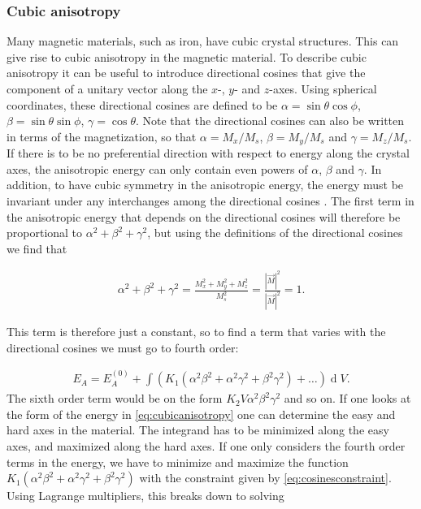 \documentclass[1p]{elsarticle}		%
\renewcommand{\d}[1]{\ensuremath{\operatorname{d}\!{#1}}}
\numberwithin{equation}{section}
\begin{document}
\subsubsection{Cubic anisotropy}
Many magnetic materials, such as iron, have cubic crystal structures. This can give rise to cubic anisotropy in the magnetic material. To describe cubic anisotropy it can be useful to introduce directional cosines that give the component of a unitary vector along the $x$-, $y$- and $z$-axes. Using spherical coordinates, these directional cosines are defined to be $\alpha = \sin\theta\cos\phi$, $\beta = \sin\theta\sin\phi$, $\gamma = \cos\theta$. Note that the directional cosines can also be written in terms of the magnetization, so that $\alpha = M_x/M_s$, $\beta = M_y/M_s$ and $\gamma = M_z/M_s$. If there is to be no preferential direction with respect to energy along the crystal axes, the anisotropic energy can only contain even powers of $\alpha$, $\beta$ and $\gamma$. In addition, to have cubic symmetry in the anisotropic energy, the energy must be invariant under any interchanges among the directional cosines \cite{Kittel:ISSP}. The first term in the anisotropic energy that depends on the directional cosines will therefore be proportional to $\alpha^2+\beta^2+\gamma^2$, but using the definitions of the directional cosines we find that

\begin{align}
\label{eq:cosinesconstraint}
\alpha^2+\beta^2+\gamma^2 = \frac{M_x^2+M_y^2+M_z^2}{M_s^2} = \frac{|\vec{M}|^2}{|\vec{M}|^2} = 1.
\end{align}

This term is therefore just a constant, so to find a term that varies with the directional cosines we must go to fourth order:

\begin{align}
\label{eq:cubicanisotropy}
E_A = E_A^{(0)} + \int (K_1 (\alpha^2\beta^2+\alpha^2\gamma^2+\beta^2\gamma^2) + \ldots ) \d V.
\end{align}
The sixth order term would be on the form $K_2 V \alpha^2\beta^2\gamma^2$ and so on. If one looks at the form of the energy in \eqref{eq:cubicanisotropy} one can determine the easy and hard axes in the material. The integrand has to be minimized along the easy axes, and maximized along the hard axes. If one only considers the fourth order terms in the energy, we have to minimize and maximize the function $K_1 (\alpha^2\beta^2+\alpha^2\gamma^2+\beta^2\gamma^2)$ with the constraint given by \eqref{eq:cosinesconstraint}. Using Lagrange multipliers, this breaks down to solving 
\end{document}
